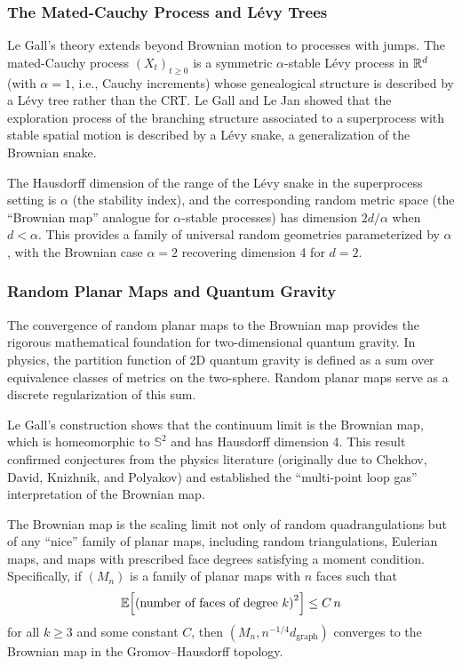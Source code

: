 \subsubsection{The Mated-Cauchy Process and L\'evy Trees}

Le Gall's theory extends beyond Brownian motion to processes with jumps. The mated-Cauchy process $(X_t)_{t \geq 0}$ is a symmetric $\alpha$-stable L\'evy process in $\mathbb{R}^d$ (with $\alpha = 1$, i.e., Cauchy increments) whose genealogical structure is described by a L\'evy tree rather than the CRT. Le Gall and Le Jan showed that the exploration process of the branching structure associated to a superprocess with stable spatial motion is described by a L\'evy snake, a generalization of the Brownian snake.

\begin{remark}
The Hausdorff dimension of the range of the L\'evy snake in the superprocess setting is $\alpha$ (the stability index), and the corresponding random metric space (the ``Brownian map'' analogue for $\alpha$-stable processes) has dimension $2d/\alpha$ when $d < \alpha$. This provides a family of universal random geometries parameterized by $\alpha$, with the Brownian case $\alpha = 2$ recovering dimension 4 for $d = 2$.
\end{remark}

\subsubsection{Random Planar Maps and Quantum Gravity}

The convergence of random planar maps to the Brownian map provides the rigorous mathematical foundation for two-dimensional quantum gravity. In physics, the partition function of 2D quantum gravity is defined as a sum over equivalence classes of metrics on the two-sphere. Random planar maps serve as a discrete regularization of this sum.

Le Gall's construction shows that the continuum limit is the Brownian map, which is homeomorphic to $\mathbb{S}^2$ and has Hausdorff dimension 4. This result confirmed conjectures from the physics literature (originally due to Chekhov, David, Knizhnik, and Polyakov) and established the ``multi-point loop gas'' interpretation of the Brownian map.

\begin{theorem}
The Brownian map is the scaling limit not only of random quadrangulations but of any ``nice'' family of planar maps, including random triangulations, Eulerian maps, and maps with prescribed face degrees satisfying a moment condition. Specifically, if $(M_n)$ is a family of planar maps with $n$ faces such that
\[
    \operatorname{\mathbb{E}}\!\left[\text{(number of faces of degree }k\text{)}^2\right] \leq C\, n
\]
for all $k \geq 3$ and some constant $C$, then $(M_n, n^{-1/4} d_{\text{graph}})$ converges to the Brownian map in the Gromov--Hausdorff topology.
\end{theorem}

